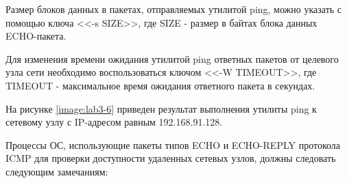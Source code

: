 
	Размер блоков данных в пакетах, отправляемых утилитой ping, можно указать с помощью ключа <<-s SIZE>>, где SIZE - размер в байтах блока данных ECHO-пакета.


	Для изменения времени ожидания утилитой ping ответных пакетов от целевого узла сети необходимо воспользоваться ключом <<-W TIMEOUT>>, где TIMEOUT -
	максимальное время ожидания ответного пакета в секундах.

	На рисунке \ref{image:lab3-6} приведен результат выполнения утилиты ping к сетевому узлу с IP-адресом равным 192.168.91.128.


	Процессы ОС, использующие пакеты типов ECHO и ECHO-REPLY протокола ICMP для проверки доступности удаленных сетевых узлов,
	должны следовать следующим замечаниям:

